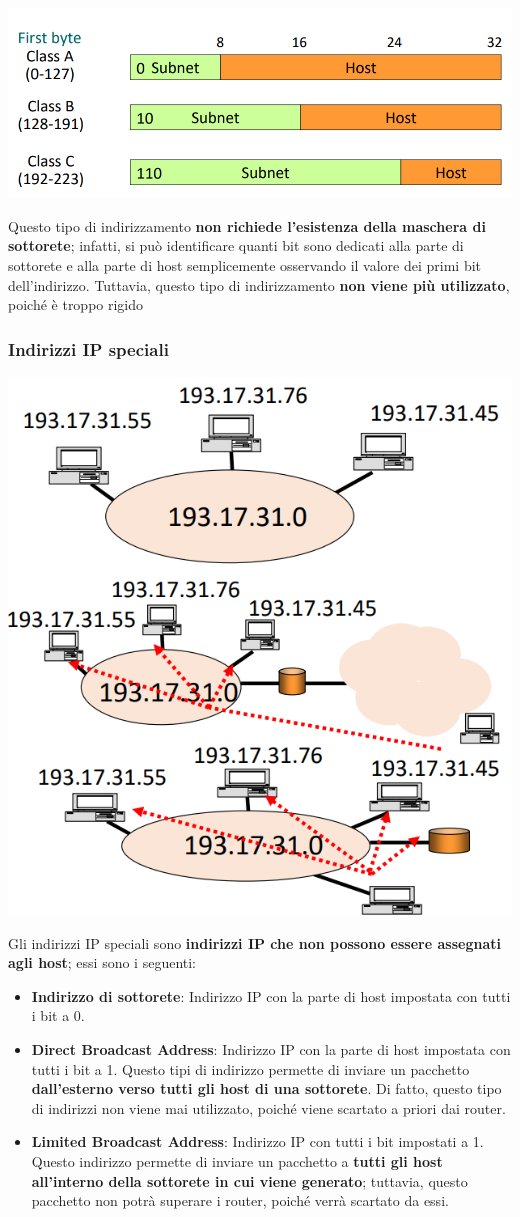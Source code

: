 \documentclass[12pt]{article}
\begin{document}
\begin{itemize}
\begin{itemize}
    \end{itemize}
    \begin{center}
        \includegraphics[width =0.80\linewidth]{Images/86.png}
    \end{center}
    Questo tipo di indirizzamento \textbf{non richiede l'esistenza della maschera di sottorete}; infatti, si può identificare quanti bit sono dedicati alla parte di sottorete e alla parte di host semplicemente osservando il valore dei primi bit dell'indirizzo.
    Tuttavia, questo tipo di indirizzamento \textbf{non viene più utilizzato}, poiché è troppo rigido
\end{itemize}
\subsubsection{Indirizzi IP speciali}
\begin{center}
    \includegraphics[width =0.50\linewidth]{Images/87.png}
\end{center}
Gli indirizzi IP speciali sono \textbf{indirizzi IP che non possono essere assegnati agli host}; essi sono i seguenti:
\begin{itemize}
    \item \textbf{Indirizzo di sottorete}: Indirizzo IP con la parte di host impostata con tutti i bit a 0.
    \item \textbf{Direct Broadcast Address}: Indirizzo IP con la parte di host impostata con tutti i bit a 1. Questo tipi di indirizzo permette di inviare un pacchetto \textbf{dall'esterno verso tutti gli host di una sottorete}.
    Di fatto, questo tipo di indirizzi non viene mai utilizzato, poiché viene scartato a priori dai router.
    \item \textbf{Limited Broadcast Address}: Indirizzo IP con tutti i bit impostati a 1. Questo indirizzo permette di inviare un pacchetto a \textbf{tutti gli host all'interno della sottorete in cui viene generato}; tuttavia, questo pacchetto non potrà superare i router, poiché verrà scartato da essi.
\end{itemize}
\end{document}
